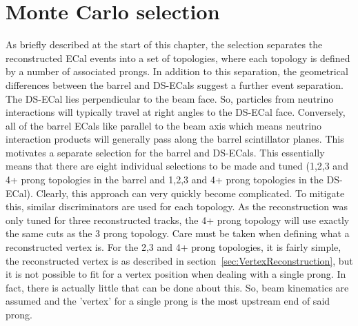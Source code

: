


\section{Monte Carlo selection}
As briefly described at the start of this chapter, the selection separates the reconstructed ECal events into a set of topologies, where each topology is defined by a number of associated prongs.  In addition to this separation, the geometrical differences between the barrel and DS-ECals suggest a further event separation.  The DS-ECal lies perpendicular to the beam face.  So, particles from neutrino interactions will typically travel at right angles to the DS-ECal face.  Conversely, all of the barrel ECals like parallel to the beam axis which means neutrino interaction products will generally pass along the barrel scintillator planes.  This motivates a separate selection for the barrel and DS-ECals.  This essentially means that there are eight individual selections to be made and tuned (1,2,3 and 4+ prong topologies in the barrel and 1,2,3 and 4+ prong topologies in the DS-ECal).  Clearly, this approach can very quickly become complicated.  To mitigate this, similar discriminators are used for each topology.  As the reconstruction was only tuned for three reconstructed tracks, the 4+ prong topology will use exactly the same cuts as the 3 prong topology.
\newline
\newline
Care must be taken when defining what a reconstructed vertex is.  For the 2,3 and 4+ prong topologies, it is fairly simple, the reconstructed vertex is as described in section~\ref{sec:VertexReconstruction}, but it is not possible to fit for a vertex position when dealing with a single prong.  In fact, there is actually little that can be done about this.  So, beam kinematics are assumed and the 'vertex' for a single prong is the most upstream end of said prong.
\newline
